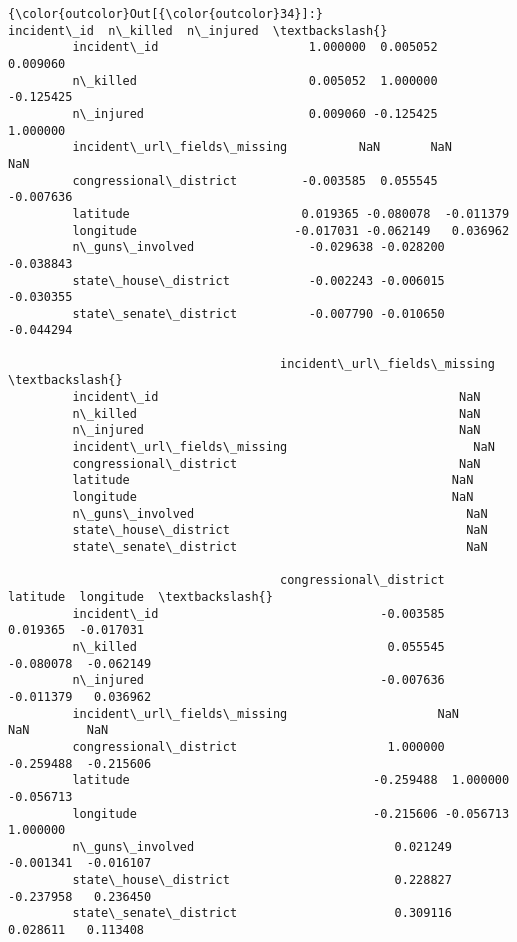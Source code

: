 \documentclass[11pt]{article}
\begin{document}
\begin{Verbatim}[commandchars=\\\{\}]
{\color{outcolor}Out[{\color{outcolor}34}]:}                              incident\_id  n\_killed  n\_injured  \textbackslash{}
         incident\_id                     1.000000  0.005052   0.009060   
         n\_killed                        0.005052  1.000000  -0.125425   
         n\_injured                       0.009060 -0.125425   1.000000   
         incident\_url\_fields\_missing          NaN       NaN        NaN   
         congressional\_district         -0.003585  0.055545  -0.007636   
         latitude                        0.019365 -0.080078  -0.011379   
         longitude                      -0.017031 -0.062149   0.036962   
         n\_guns\_involved                -0.029638 -0.028200  -0.038843   
         state\_house\_district           -0.002243 -0.006015  -0.030355   
         state\_senate\_district          -0.007790 -0.010650  -0.044294   
         
                                      incident\_url\_fields\_missing  \textbackslash{}
         incident\_id                                          NaN   
         n\_killed                                             NaN   
         n\_injured                                            NaN   
         incident\_url\_fields\_missing                          NaN   
         congressional\_district                               NaN   
         latitude                                             NaN   
         longitude                                            NaN   
         n\_guns\_involved                                      NaN   
         state\_house\_district                                 NaN   
         state\_senate\_district                                NaN   
         
                                      congressional\_district  latitude  longitude  \textbackslash{}
         incident\_id                               -0.003585  0.019365  -0.017031   
         n\_killed                                   0.055545 -0.080078  -0.062149   
         n\_injured                                 -0.007636 -0.011379   0.036962   
         incident\_url\_fields\_missing                     NaN       NaN        NaN   
         congressional\_district                     1.000000 -0.259488  -0.215606   
         latitude                                  -0.259488  1.000000  -0.056713   
         longitude                                 -0.215606 -0.056713   1.000000   
         n\_guns\_involved                            0.021249 -0.001341  -0.016107   
         state\_house\_district                       0.228827 -0.237958   0.236450   
         state\_senate\_district                      0.309116  0.028611   0.113408   
         

\end{Verbatim}
\end{document}
